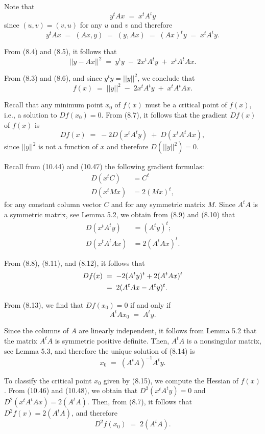 
Note that
\begin{equation}
y^tAx \;=\; x^tA^ty
\end{equation}
since $(u,v) = (v,u)$ for any $u$ and $v$ and therefore
\[
y^tAx \;=\; (Ax,y) \;=\; (y,Ax) \;=\; (Ax)^ty \;=\; x^tA^ty.
\]

From (8.4) and (8.5), it follows that
\begin{equation}
||y-Ax||^2 \;=\; y^ty \;-\; 2x^tA^ty \;+\; x^tA^tAx.
\end{equation}

From (8.3) and (8.6), and since $y^ty = ||y||^2$, we conclude that
\begin{equation}
f(x) \;=\; ||y||^2 \;-\; 2x^tA^ty \;+\; x^tA^tAx.
\end{equation}

Recall that any minimum point $x_0$ of $f(x)$ must be a critical point of $f(x)$, i.e.,
a solution to $Df(x_0) = 0$. From (8.7), it follows that the gradient $Df(x)$ of $f(x)$
is
\begin{equation}
Df(x) \;=\; -2D(x^tA^ty) \;+\; D(x^tA^tAx),
\end{equation}
since $||y||^2$ is not a function of $x$ and therefore $D(||y||^2) = 0$.

Recall from (10.44) and (10.47) the following gradient formulas:
\begin{align}
D(x^tC) &= C^t \\
D(x^tMx) &= 2(Mx)^t,
\end{align}
for any constant column vector $C$ and for any symmetric matrix $M$. Since $A^tA$ is a
symmetric matrix, see Lemma 5.2, we obtain from (8.9) and (8.10) that
\begin{align}
D(x^tA^ty) &= (A^ty)^t; \\
D(x^tA^tAx) &= 2(A^tAx)^t.
\end{align}

From (8.8), (8.11), and (8.12), it follows that
\begin{align}
Df(x) \;&=\; -2(A^ty)^t + 2(A^tAx)^t \notag\\
&=\; 2(A^tAx - A^ty)^t.
\end{align}

From (8.13), we find that $Df(x_0) = 0$ if and only if
\begin{equation}
A^tAx_0 \;=\; A^ty.
\end{equation}

Since the columns of $A$ are linearly independent, it follows from Lemma 5.2 that the
matrix $A^tA$ is symmetric positive definite. Then, $A^tA$ is a nonsingular matrix, see
Lemma 5.3, and therefore the unique solution of (8.14) is
\begin{equation}
x_0 \;=\; (A^tA)^{-1}A^ty.
\end{equation}

To classify the critical point $x_0$ given by (8.15), we compute the Hessian of
$f(x)$. From (10.46) and (10.48), we obtain that $D^2(x^tA^ty) = 0$ and
$D^2(x^tA^tAx) = 2(A^tA)$. Then, from (8.7), it follows that $D^2f(x) = 2(A^tA)$, and
therefore
\[
D^2f(x_0) \;=\; 2(A^tA).
\]
